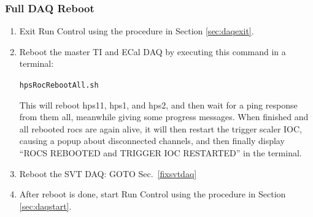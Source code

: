\documentclass[12pt]{article}
\begin{document}
\subsubsection{Full DAQ Reboot}
\label{fixdaqbig}

\begin{enumerate}
\item Exit Run Control using the procedure in Section \ref{sec:daqexit}.
\item Reboot the master TI and ECal DAQ by executing this command in a terminal:\newline
\centerline{\texttt{hpsRocRebootAll.sh}}
This will reboot hps11, hps1, and hps2, and then wait for a ping response from them all, meanwhile giving some progress messages.  When finished and all rebooted rocs are again alive, it will then restart the trigger scaler IOC, causing a popup about disconnected channels, and then finally display ``ROCS REBOOTED and TRIGGER IOC RESTARTED'' in the terminal.

\item Reboot the SVT DAQ: GOTO Sec.~\ref{fixsvtdaq}

\item After reboot is done, start Run Control using the procedure in Section \ref{sec:daqstart}.
\end{enumerate}

%
%
\end{document}
